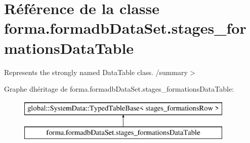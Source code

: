 \hypertarget{classforma_1_1formadb_data_set_1_1stages__formations_data_table}{}\section{Référence de la classe forma.\+formadb\+Data\+Set.\+stages\+\_\+formations\+Data\+Table}
\label{classforma_1_1formadb_data_set_1_1stages__formations_data_table}


Represents the strongly named Data\+Table class. /summary$>$  


Graphe d\textquotesingle{}héritage de forma.\+formadb\+Data\+Set.\+stages\+\_\+formations\+Data\+Table\+:\begin{figure}[H]
\begin{center}
\leavevmode
\includegraphics[height=2.000000cm]{classforma_1_1formadb_data_set_1_1stages__formations_data_table}
\end{center}
\end{figure}
